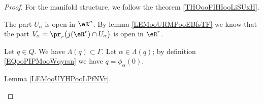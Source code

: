 \begin{proof}

	For the manifold structure, we follow the theorem \ref{THOooFIHIooLiSUxH}.
	\begin{subproof}
		The part  \(U_{\alpha} \) is open in \( \eR^n\). By lemma \ref{LEMooURMPooEBfsTF} we know that the part \( V_{\alpha}=\pr_r\big( j(\eR^r)\cap U_{\alpha} \big) \) is open in \( \eR^r\).

		\spitem[\( \bigcup_{\alpha\in\Gamma}\phi_{\alpha}(V_{\alpha})=Q\)]
		Let \( q\in Q\). We have \( \Lambda(q)\subset \Gamma\). Let \( \alpha\in \Lambda(q)\); by definition \eqref{EQooPIPMooWqyrsn} we have \( q=\phi_{\alpha}(0)\).

		Lemma \ref{LEMooUYHPooLPfNVr}.


\end{subproof}
\end{proof}
